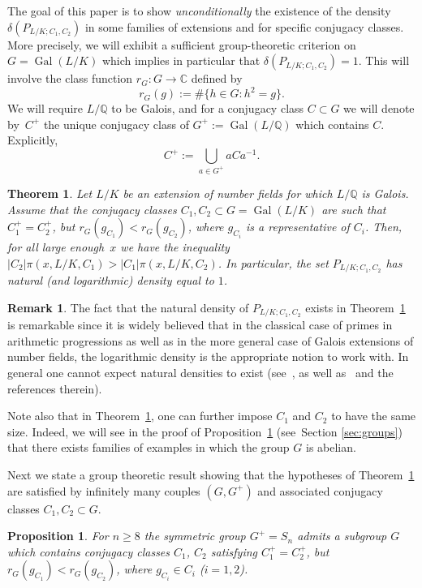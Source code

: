 \documentclass[10pt]{amsart}
\newtheorem{proposition}[X]{Proposition}
\newtheorem{theorem}[X]{Theorem}
\theoremstyle{definition}
\newtheorem*{remark*}{Remark}
\DeclareMathOperator{\Gal}{Gal}
\newcommand{\Q}{\mathbb Q}
\begin{document}
The goal of this paper is to show \emph{unconditionally} the existence of the density $\delta(P_{L/K;C_1,C_2})$ in some families of
extensions and for specific conjugacy classes.
More precisely, we will exhibit a sufficient group-theoretic criterion on $G=\Gal(L/K)$ which implies in particular that $\delta(P_{L/K;C_1,C_2})=1$.
This will involve the class function $r_G:G\to \mathbb C$ defined by
\[ r_G(g) := \# \{ h\in G \colon h^2=g\}.\]
We will require $L/\Q$ to be Galois, and for a conjugacy class $C\subset G$ we will denote by~$C^+$ the unique conjugacy class of $G^+:=\Gal(L/\Q)$ which contains $C$. Explicitly,
\begin{equation}
C^+:=\bigcup_{a\in G^+} a C a^{-1}.
\label{equation definition C+}
\end{equation}


\begin{theorem}
\label{theorem main}
Let $L/K$ be an extension of number fields for which $L/\Q$ is \hbox{Galois}. Assume that the conjugacy classes $C_1,C_2\subset G=\Gal(L/K)$ are such that \hbox{$C_1^+=C_2^+$}, but $ r_G(g_{C_1}) < r_G(g_{C_2}) $, where $g_{C_i}$ is a representative of $C_i$. Then, for all large enough~$x$ we have the inequality $ |C_2|\pi(x,L/K,C_1) >|C_1| \pi(x,L/K,C_2) $. In particular, the set $P_{L/K;C_1,C_2}$ has natural (and logarithmic) density equal to $1$.
\end{theorem}


\begin{remark*}
The fact that the natural density of $P_{L/K;C_1,C_2}$ exists in Theorem~\ref{theorem main} is remarkable since it is widely believed that in the classical case of primes in arithmetic progressions as well as in the more general case of Galois extensions of number fields, the logarithmic density is the appropriate notion to work with. In general one cannot expect natural densities to exist
(see~\cite{Ka}, as well as~\cite[p.\,174]{RS} and the references therein).

Note also that in Theorem~\ref{theorem main}, one can further impose $C_1$ and $C_2$ to have the same size. Indeed, we will see in the proof of Proposition~\ref{proposition main} (see~Section \ref{sec:groups}) that there exists families of examples in which the group $G$ is abelian.
\end{remark*}

Next we state a group theoretic result showing that the hypotheses of Theorem~\ref{theorem main} are satisfied by infinitely many couples $(G,G^+)$ and associated conjugacy classes $C_1,C_2 \subset G$.
\begin{proposition}
\label{proposition main}
For $n\geq 8$ the symmetric group $G^+=S_n$ admits a subgroup $G$ which contains conjugacy classes $C_1$, $C_2$ satisfying $C_1^+=C_2^+$, but $ r_G(g_{C_1}) < r_G(g_{C_2}) $, where $g_{C_i}\in C_i$ ($i=1,2$).
\end{proposition}
\end{document}
